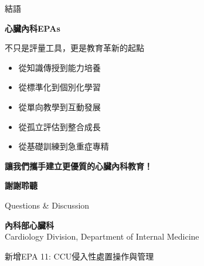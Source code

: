 \documentclass[aspectratio=169]{beamer}
\begin{document}
\begin{frame}{結語}
\begin{center}
\Large{\textcolor{emergency_red}{\textbf{心臟內科EPAs}}}
\end{center}

\vspace{0.5cm}

\begin{center}
\large{不只是評量工具，更是教育革新的起點}
\end{center}

\vspace{1cm}

\begin{itemize}
\item 從知識傳授到能力培養
\item 從標準化到個別化學習
\item 從單向教學到互動發展
\item 從孤立評估到整合成長
\item \textcolor{emergency_red}{從基礎訓練到急重症專精}
\end{itemize}

\vspace{1cm}

\begin{center}
\textbf{\textcolor{emergency_blue}{讓我們攜手建立更優質的心臟內科教育！}}
\end{center}
\end{frame}

\begin{frame}[plain]
\begin{center}
\Huge{\textcolor{emergency_blue}{\textbf{謝謝聆聽}}}

\vspace{1cm}

\Large{\textcolor{emergency_gray}{Questions \& Discussion}}

\vspace{1cm}

\textcolor{emergency_red}{\textbf{內科部心臟科}}\\
\textcolor{emergency_blue}{Cardiology Division, Department of Internal Medicine}

\vspace{0.5cm}
\textcolor{emergency_red}{\scriptsize 新增EPA 11: CCU侵入性處置操作與管理}
\end{center}
\end{frame}
\end{document}
